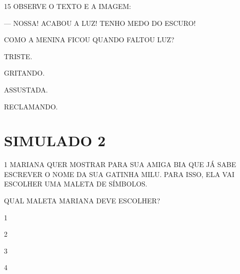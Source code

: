 \num{15} OBSERVE O TEXTO E A IMAGEM:


— NOSSA! ACABOU A LUZ! TENHO MEDO DO ESCURO!

COMO A MENINA FICOU QUANDO FALTOU LUZ?

\begin{escolha}
\item TRISTE.

\item GRITANDO.

\item ASSUSTADA.

\item RECLAMANDO.
\end{escolha}

\chapter{SIMULADO 2}

\num{1} MARIANA QUER MOSTRAR PARA SUA AMIGA BIA QUE JÁ SABE ESCREVER O NOME DA SUA GATINHA MILU. PARA ISSO, ELA VAI ESCOLHER UMA MALETA DE SÍMBOLOS. 






QUAL MALETA MARIANA DEVE ESCOLHER?

\begin{escolha}
\item 1

\item 2

\item 3

\item 4
\end{escolha}

